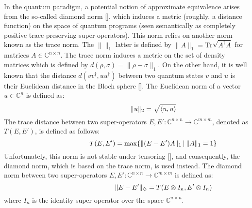 In the quantum paradigm, a potential notion of approximate equivalence arises from the so-called diamond norm [\cite{watrous2018theory}], which induces a metric (roughly, a distance function) on the space of quantum programs (seen semantically as completely positive trace-preserving super-operators). This norm relies on another norm known as the trace norm. The $\lVert  \rVert_{1}$ latter is defined by  $\lVert A \rVert_{1} = \text{Tr}\sqrt{A^{\dag}A}$  for matrices $A \in \mathbb{C}^{n\times n}$. The trace norm induces a metric on the set of density matrices which is defined by $d(\rho, \sigma) = \lVert \rho -\sigma\rVert_{1}$. On the other hand, it is well known that the distance $d(vv^{\dag}, uu^{\dag})$ between two quantum states $v$ and $u$ is their Euclidean distance in the Bloch
sphere [\cite{wallman2016noise,nielsen2010quantum}]. The Euclidean norm of a vector $u \in \mathbb{C}^{n} $ is defined as:
\begin{equation} \label{eq:euclidean_distance}
\begin{centering}
\hspace{80pt}
\lVert u \rVert_{2} = \sqrt{\langle u, u\rangle} 
 \end{centering}
\end{equation}
The trace distance between two super-operators $E, E': \mathbb{C}^{n\times n} \xrightarrow{} \mathbb{C}^{m\times m }$,  denoted as $T(E,E')$, is defined as follows:
\begin{equation} \label{eq:trace_distance}
\begin{centering}
\hspace{80pt}
 T(E,E')= \max\{\lVert (E-E') A \rVert_{1} \hspace{2pt}  \vert \hspace{2pt}  \lVert A \rVert_{1}=1\} 
 \end{centering}
\end{equation}
Unfortunately, this norm is not stable under tensoring [\cite{watrous2018theory}], and consequently, the diamond norm, which is based on the trace norm, is used instead. The diamond norm between two super-operators $E, E': \mathbb{C}^{n\times n} \xrightarrow{} \mathbb{C}^{m\times m }$ is defined as:
\begin{equation}  \label{eq:diamond_distance}
\begin{centering}
\hspace{110pt}
 \lVert E-E'\rVert_{\diamondsuit} =  T(E \otimes I_{n},E' \otimes I_{n}) 
 \end{centering}
\end{equation}
where $I_{n} $ is the identity super-operator over the space $\mathbb{C}^{n\times n}$.


